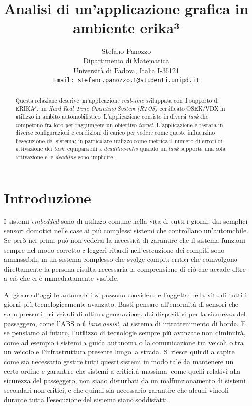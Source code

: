 \documentclass{article}
\title{Analisi di un'applicazione grafica in ambiente erika³}
\author{
  Stefano Panozzo\\
  Dipartimento di Matematica\\
  Università di Padova, Italia I-35121\\
  \texttt{Email: stefano.panozzo.1@studenti.unipd.it} \\
}
\date{}
\begin{document}
\maketitle

\begin{abstract}
Questa relazione descrive un'applicazione \textit{real-time} sviluppata con il supporto di ERIKA³, un \textit{Hard Real Time Operating System (RTOS)} certificato OSEK/VDX in utilizzo in ambito automobilistico. L'applicazione consiste in diversi \textit{task} che competono fra loro per raggiungere un obiettivo \textit{target}. L'applicazione è testata in diverse configurazioni e condizioni di carico per vedere come queste influenzino l'esecuzione del sistema; in particolare utilizzo come metrica il numero di errori di attivazione dei \textit{task}, equiparabili a \textit{deadline-miss} quando un \textit{task} supporta una sola attivazione e le \textit{deadline} sono implicite.
\end{abstract}


\section{Introduzione}
I sistemi \textit{embedded} sono di utilizzo comune nella vita di tutti i giorni: dai semplici sensori domotici nelle case ai più complessi sistemi che controllano un'automobile. Se però nei primi può non vedersi la necessità di garantire che il sistema funzioni sempre nel modo corretto e leggeri ritardi nell'esecuzione dei compiti sono ammissibili, in un sistema complesso che svolge compiti critici che coinvolgono direttamente la persona risulta necessaria la comprensione di ciò che accade oltre a ciò che ci è immediatamente visibile.

Al giorno d'oggi le automobili si possono considerare l'oggetto nella vita di tutti i giorni più tecnologicamente avanzato. Basti pensare all'enormità di sensori che sono presenti nei veicoli di ultima generazione: dai dispositivi per la sicurezza del passeggero, come l'ABS o il \textit{lane assist}, ai sistema di intrattenimento di bordo. E se pensiamo al futuro, l'utilizzo di tecnologie sempre più avanzate non diminuirà, come ad esempio i sistemi a guida autonoma o la comunicazione tra veicoli o tra un veicolo e l'infrastruttura presente lungo la strada. Si riesce quindi a capire come sia necessario gestire tutti questi sistemi in modo tale da mantenere un certo ordine e garantire che sistemi a criticità massima, come quelli relativi alla sicurezza del passeggero, non siano disturbati da un malfunzionamento di sistemi secondari non critici, e che quindi sia necessario garantire che alcuni vincoli durante tutta l'esecuzione del sistema siano soddisfatti.
\end{document}

